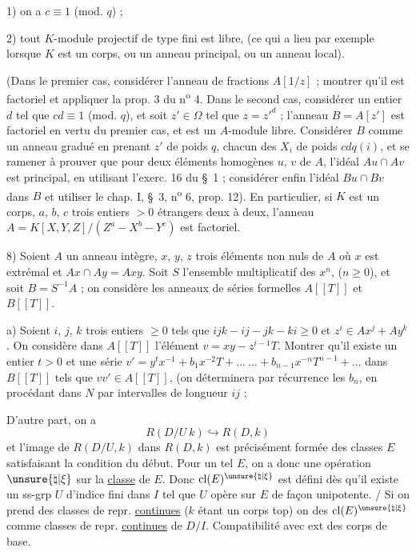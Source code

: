 1) on a $c\equiv 1$ (mod. $q$) ;

2) tout $K$-module projectif de type fini est libre, (ce qui a lieu par exemple lorsque $K$ est un corps, ou un anneau principal, ou un anneau local).

(Dans le premier cas, considérer l'anneau de fractions $A[1/z]$ ; montrer qu'il est factoriel et appliquer la prop. 3 du n\textsuperscript{o} 4. Dans le second cas, considérer un entier $d$ tel que $cd\equiv 1$ (mod. $q$), et soit $z'\in\Omega$ tel que $z=z'^{d}$ ; l'anneau $B=A[z']$ est factoriel en vertu du premier cas, et est un $A$-module libre. Considérer $B$ comme un anneau gradué en prenant $z'$ de poids $q$, chacun des $X_i$ de poids $cdq(i)$, et se ramener à prouver que pour deux éléments homogènes $u$, $v$ de $A$, l'idéal $Au\cap Av$ est principal, en utilisant l'exerc. 16 du \S\ 1 ; considérer enfin l'idéal $Bu\cap Bv$ dans $B$ et utiliser le chap. I, \S\ 3, n\textsuperscript{o} 6, prop. 12). En particulier, si $K$ est un corps, $a$, $b$, $c$ trois entiers $>0$ étrangers deux à deux, l'anneau $A=K[X,Y,Z]/(Z^a-X^b-Y^c)$ est factoriel.

8) Soient $A$ un anneau intègre, $x$, $y$, $z$ trois éléments non nuls de $A$ où $x$ est extrémal et $Ax\cap Ay=Axy$. Soit $S$ l'ensemble multiplicatif des $x^n$, ($n\geq 0$), et soit $B=S^{-1}A$ ; on considère les anneaux de séries formelles $A[[T]]$ et $B[[T]]$.

a) Soient $i$, $j$, $k$ trois entiers $\geq 0$ tels que $ijk-ij-jk-ki\geq 0$ et $z^i\in Ax^j+Ay^k$. On considère dans $A[[T]]$ l'élément $v=xy-z^{i-1}T$. Montrer qu'il existe un entier $t>0$ et une série $v'=y^tx^{-1}+b_1x^{-2}T+\ldots\ \ldots+b_{n-1}x^{-n}T^{n-1}+\ldots$ dans $B[[T]]$ tels que $vv'\in A[[T]]$, (on déterminera par récurrence les $b_n$, en procédant dans $N$ par intervalles de longueur $ij$ ;


D'autre part, on a
\[
R(D/U\ k)\hookrightarrow R(D,k)
\]
et l'image de $R(D/U,k)$ dans $R(D,k)$ est précisément formée des classes  $E$ satisfaisant la condition du début. Pour un tel $E$, on a donc une opération $\unsure{\natural|\xi}$ sur la \uline{classe} de $E$. Donc $\operatorname{cl}(E)^{\unsure{\natural|\xi}}$ est défini dès qu'il existe un ss-grp  $U$ d'indice fini dans $I$ tel que  $U$ opère sur $E$ de façon unipotente. / Si on prend des classes de repr. \uline{continues} ($k$ étant un corps top) on   des \deleted{$\unsure{=}$} $\operatorname{cl}(E)^{\unsure{\natural|\xi}}$ comme classes de repr. \uline{continues} de $D/I$. Compatibilité avec ext des corps de base.

